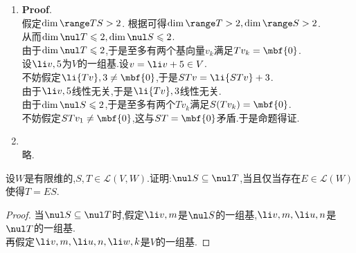 \documentclass{ctexart}
\begin{document}
\begin{solution}
    \begin{enumerate}[label=\tbf{(\arabic*)}]
        \item \textbf{Proof}.\\
            假定$\dim\range TS>2$.
            根据可得$\dim\range T>2,\dim\range S>2$.\\
            从而$\dim\nul T\leqslant 2,\dim\nul S\leqslant 2$.\\
            由于$\dim\nul T\leqslant 2$,于是至多有两个基向量$v_k$满足$Tv_k=\mbf{0}$.\\
            设$\li v,5$为$V$的一组基.设$v=\li v+5\in V$.\\
            不妨假定$\li {Tv},3\neq\mbf{0}$,于是$STv=\li {STv}+3$.\\
            由于$\li v,5$线性无关,于是$\li {Tv},3$线性无关.\\
            由于$\dim\nul S\leqslant 2$,于是至多有两个$Tv_k$满足$S(Tv_k)=\mbf{0}$.\\
            不妨假定$STv_1\neq\mbf{0}$,这与$ST=\mbf{0}$矛盾.于是命题得证.
        \item {}\\
            略.
    \end{enumerate}
\end{solution}
\begin{problem}[25.]
    设$W$是有限维的,$S,T\in\mathcal{L}(V,W)$.证明:$\nul S\subseteq\nul T$,当且仅当存在$E\in\mathcal{L}(W)$使得$T=ES$.
\end{problem}
\begin{proof}
    当$\nul S\subseteq\nul T$时,假定$\li v,m$是$\nul S$的一组基,$\li v,m,\li u,n$是$\nul T$的一组基.\\
    再假定$\li v,m,\li u,n,\li w,k$是$V$的一组基.
    
\end{proof}
\end{document}
